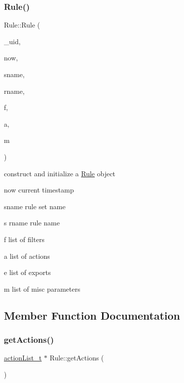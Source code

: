 \subsubsection{\texorpdfstring{Rule()}{Rule()}}
{\footnotesize\ttfamily Rule\+::\+Rule (\begin{DoxyParamCaption}\item[{int}]{\+\_\+uid,  }\item[{time\+\_\+t}]{now,  }\item[{string}]{sname,  }\item[{string}]{rname,  }\item[{\hyperlink{ProcModuleInterface_8h_a2afc1e9fc63b2cfcd86ec2435f24e27c}{filter\+List\+\_\+t} \&}]{f,  }\item[{\hyperlink{Rule_8h_acdc7809742ec5b554bf13b4c12053a6a}{action\+List\+\_\+t} \&}]{a,  }\item[{\hyperlink{Rule_8h_a9fb303c0fc85a5e78d6d35728fe7fe74}{misc\+List\+\_\+t} \&}]{m }\end{DoxyParamCaption})}



construct and initialize a \hyperlink{classRule}{Rule} object 

\begin{DoxyItemize}
\item {\ttfamily now} current timestamp \item {\ttfamily sname} rule set name \item {\ttfamily s} rname rule name \item {\ttfamily f} list of filters \item {\ttfamily a} list of actions \item {\ttfamily e} list of exports \item {\ttfamily m} list of misc parameters \end{DoxyItemize}


\subsection{Member Function Documentation}
\mbox{\label{classRule_a2537cf47f367282809a66f9bfb733020}} 
\subsubsection{\texorpdfstring{get\+Actions()}{getActions()}}
{\footnotesize\ttfamily \hyperlink{Rule_8h_acdc7809742ec5b554bf13b4c12053a6a}{action\+List\+\_\+t} $\ast$ Rule\+::get\+Actions (\begin{DoxyParamCaption}{ }\end{DoxyParamCaption})}



